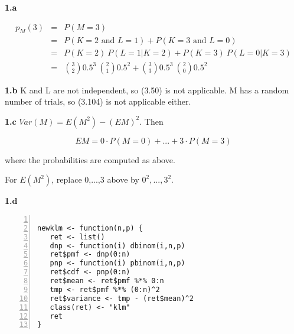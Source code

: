 \documentclass{article}
\begin{document}
{\bf 1.a}

\begin{eqnarray}
p_M(3)&=& P(M = 3) \\ 
&=& P(K = 2 \textrm{ and } L = 1) +
    P(K = 3 \textrm{ and } L = 0) \\
&=& P(K = 2) ~ P(L = 1 | K = 2) +
    P(K = 3) ~ P(L = 0 | K = 3) \\
&=& \binom{3}{2} 0.5^3 ~ \binom{2}{1} 0.5^2 +
    \binom{3}{3} 0.5^3 ~ \binom{2}{0} 0.5^2 
\end{eqnarray}

{\bf 1.b}  K and L are not independent, so (3.50) is not applicable.  M
has a random number of trials, so (3.104) is not applicable either.

{\bf 1.c}  $Var(M) = E(M^2) - (EM)^2$.  Then 

\begin{equation}
EM = 0 \cdot P(M = 0) + ... + 3 \cdot P(M = 3)
\end{equation}

where the probabilities are computed as above.

For $E(M^2)$, replace 0,...,3 above by $0^2,...,3^2$.

{\bf 1.d}

\begin{lstlisting}[numbers=left]

newklm <- function(n,p) {
   ret <- list()
   dnp <- function(i) dbinom(i,n,p)
   ret$pmf <- dnp(0:n)
   pnp <- function(i) pbinom(i,n,p)
   ret$cdf <- pnp(0:n)
   ret$mean <- ret$pmf %*% 0:n
   tmp <- ret$pmf %*% (0:n)^2
   ret$variance <- tmp - (ret$mean)^2
   class(ret) <- "klm"
   ret
}

\end{lstlisting}
\end{document}
